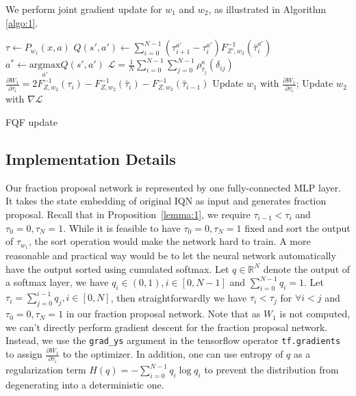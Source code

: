 \documentclass{article}
\begin{document}
We perform joint gradient update for $w_1$ and $w_2$, as illustrated in Algorithm \ref{algo:1}.

\begin{algorithm}[H]
\SetAlgoLined
\label{algo:1}
\KwInput{$x,a,r,x', \gamma \in[0,1)$}
 $\tau\leftarrow P_{w_1}(x,a)$\;
 $Q(s',a')\leftarrow \sum_{i=0}^{N-1}(\tau^{a'}_{i+1}-\tau^{a'}_{i})F^{-1}_{Z',w_2}(\hat{\tau}_i^{a'})$\;
 $a^*\leftarrow \underset{a'}{\mathrm{argmax}} Q(s',a')$\; 
 $\mathcal{L}=\frac{1}{N}\sum_{i=0}^{N-1}\sum_{j=0}^{N-1}\rho_{\hat{\tau}_j}^\kappa(\delta_{ij})$\;
 $\frac{\partial W_1}{\partial \tau_i}=2F^{-1}_{Z,w_2}(\tau_{i})-F^{-1}_{Z,w_2}(\hat{\tau}_i)-F^{-1}_{Z,w_2}(\hat{\tau}_{i-1})$\;
 Update $w_1$ with $\frac{\partial W_1}{\partial \tau_i}$; Update $w_2$ with $\nabla\mathcal{L}$\;
\caption{FQF update}
\end{algorithm}



\subsection{Implementation Details}
Our fraction proposal network is represented by one fully-connected MLP layer. It takes the state embedding of original IQN as input and generates fraction proposal. Recall that in Proposition~\ref{lemma:1}, we require $\tau_{i-1}<\tau_i$ and $\tau_0=0,\tau_N=1$. While it is feasible to have $\tau_0=0,\tau_{N}=1$ fixed and sort the output of $\tau_{w_1}$, the sort operation would make the network hard to train. A more reasonable and practical way would be to let the neural network automatically have the output sorted using cumulated softmax. Let $q\in\mathbb{R}^{N}$ denote the output of a softmax layer, we have $q_i\in(0,1), i\in[0,N-1]$ and $\sum_{i=0}^{N-1}q_i=1$. Let $\tau_i=\sum_{j=0}^{i-1}q_j, i\in[0,N]$, then straightforwardly we have $\tau_i<\tau_j$ for $\forall i<j$ and $\tau_0=0,\tau_{N}=1$ in our fraction proposal network. Note that as $W_1$ is not computed, we can't directly perform gradient descent for the fraction proposal network. Instead, we use the \verb|grad_ys| argument in the tensorflow operator \verb|tf.gradients| to assign $\frac{\partial W_1}{\partial \tau_i}$ to the optimizer. In addition, one can use entropy of $q$ as a regularization term $H(q)=-\sum_{i=0}^{N-1} q_i\log q_i$ to prevent the distribution from degenerating into a deterministic one.
\end{document}
